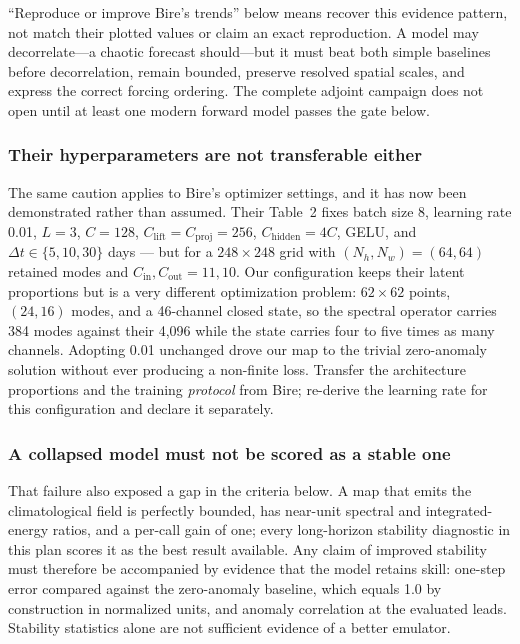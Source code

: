 \documentclass[11pt]{article}
\begin{document}
``Reproduce or improve Bire's trends'' below means recover this evidence pattern, not
match their plotted values or claim an exact reproduction.  A model may decorrelate---a
chaotic forecast should---but it must beat both simple baselines before decorrelation,
remain bounded, preserve resolved spatial scales, and express the correct forcing
ordering.  The complete adjoint campaign does not open until at least one modern
forward model passes the gate below.

\subsubsection*{Their hyperparameters are not transferable either}

The same caution applies to Bire's optimizer settings, and it has now been demonstrated
rather than assumed.  Their Table~2 fixes batch size 8, learning rate 0.01, \(L=3\),
\(C=128\), \(C_{\mathrm{lift}}=C_{\mathrm{proj}}=256\), \(C_{\mathrm{hidden}}=4C\), GELU,
and \(\Delta t\in\{5,10,30\}\) days --- but for a \(248\times248\) grid with
\((N_h,N_w)=(64,64)\) retained modes and \(C_{\mathrm{in}},C_{\mathrm{out}}=11,10\).
Our configuration keeps their latent proportions but is a very different optimization
problem: \(62\times62\) points, \((24,16)\) modes, and a 46-channel closed state, so the
spectral operator carries 384 modes against their 4,096 while the state carries four to
five times as many channels.  Adopting 0.01 unchanged drove our map to the trivial
zero-anomaly solution without ever producing a non-finite loss.  Transfer the
architecture proportions and the training \emph{protocol} from Bire; re-derive the
learning rate for this configuration and declare it separately.

\subsubsection*{A collapsed model must not be scored as a stable one}

That failure also exposed a gap in the criteria below.  A map that emits the
climatological field is perfectly bounded, has near-unit spectral and integrated-energy
ratios, and a per-call gain of one; every long-horizon stability diagnostic in this plan
scores it as the best result available.  Any claim of improved stability must therefore
be accompanied by evidence that the model retains skill: one-step error compared against
the zero-anomaly baseline, which equals 1.0 by construction in normalized units, and
anomaly correlation at the evaluated leads.  Stability statistics alone are not
sufficient evidence of a better emulator.
\end{document}
